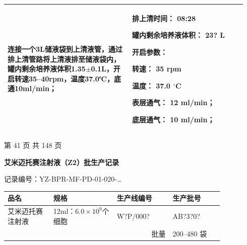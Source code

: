 \documentclass[UTF8,10pt,a4paper,fontset=fandol]{ctexart}
\newcommand{\fieldvalue}[1]{#1}
\newcommand{\handwritten}[1]{#1}
\begin{document}
\begin{center}
\begin{tabular}{|p{0.49\linewidth}|p{0.45\linewidth}|}
\begin{minipage}[t]{0.47\linewidth}
连接一个3L储液袋到上清液管，通过排上清管路将上清液排至储液袋内，罐内剩余培养液体积1.35$\pm$0.1L，开启转速35--40rpm，温度37.0℃，底通10ml/min；
\end{minipage}
&
\begin{minipage}[t]{0.43\linewidth}
排上清时间：
\fieldvalue{\handwritten{08:28}}

罐内剩余培养液体积：
\fieldvalue{\handwritten{23?}} L

开启参数：

转速：
\fieldvalue{\handwritten{35}} rpm

温度：
\fieldvalue{\handwritten{37.0}} $^\circ$C

表层通气：
\fieldvalue{\handwritten{12}} ml/min；

底层通气：
\fieldvalue{\handwritten{10}} ml/min；
\end{minipage}
\\ \hline
\end{tabular}
\end{center}

\begin{center}
第 41 页 共 148 页
\end{center}

\newpage

\begin{center}
\textbf{艾米迈托赛注射液（Z2）批生产记录}
\end{center}

\noindent
记录编号：YZ-BPR-MF-PD-01-020-\ldots

\begin{center}
\begin{tabular}{|p{0.18\linewidth}|p{0.25\linewidth}|p{0.22\linewidth}|p{0.20\linewidth}|}
\hline
品名 & 规格 & 生产线编号 & 生产批号 \\ \hline
艾米迈托赛注射液 & 12ml：$6.0\times10^{9}$个细胞 &
\fieldvalue{\handwritten{W?P/000?}} &
\fieldvalue{\handwritten{AB?3?0?}} \\ \hline
\multicolumn{3}{|r|}{批量} & 200--480 袋 \\ \hline
\end{tabular}
\end{center}
\end{document}
